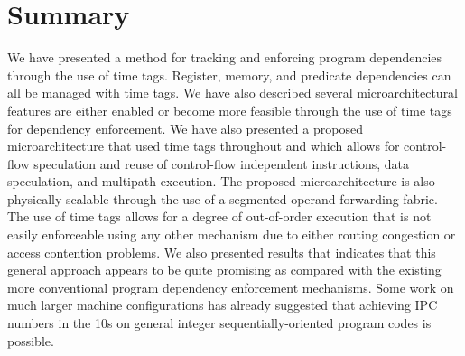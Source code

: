 \documentclass[10pt,dvips]{article}
\begin{document}
\section{Summary}
%
We have presented a method for tracking and enforcing
program dependencies through the use of time tags.
Register, memory, and predicate dependencies can all be
managed with time tags.
We have also described several microarchitectural
features are either enabled or become more feasible through
the use of time tags for dependency enforcement.
We have also presented a proposed microarchitecture that
used time tags throughout and which allows for
control-flow speculation and
reuse of
control-flow independent instructions,
data speculation,  and multipath execution.
The proposed microarchitecture is also physically scalable
through the use of a segmented operand forwarding fabric.
The use of time tags allows for a degree of out-of-order
execution that is not easily enforceable using any other
mechanism due to either routing congestion or access contention
problems.
We also presented results that indicates that this general 
approach appears to be quite
promising as compared with the existing more conventional program
dependency enforcement mechanisms.
Some work on much larger machine configurations has already
suggested that achieving IPC numbers in the 10s on general integer
sequentially-oriented program codes is possible.
%


%
\end{document}
